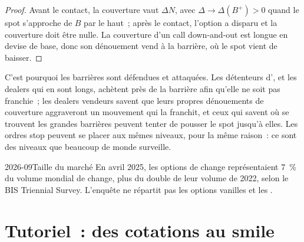 \begin{proof}
Avant le contact, la couverture vaut $\Delta N$, avec $\Delta \to \Delta(B^+) > 0$ quand le spot
s'approche de $B$ par le haut~; après le contact, l'option a disparu et la couverture doit être nulle.
La couverture d'un call down-and-out est longue en devise de base, donc son dénouement vend à
la barrière, où le spot vient de baisser.
\end{proof}

C'est pourquoi les barrières sont défendues et attaquées. Les détenteurs d', et les dealers
qui en sont longs, achètent près de la barrière afin qu'elle ne soit pas franchie~; les dealers vendeurs
savent que leurs propres dénouements de couverture aggraveront un mouvement qui la franchit, et ceux qui
savent où se trouvent les grandes barrières peuvent tenter de pousser le spot jusqu'à elles. Les ordres stop peuvent
se placer aux mêmes niveaux, pour la même raison~: ce sont des niveaux que beaucoup de monde surveille.

\begin{dated}{2026-09}{Taille du marché}\label{dat:m2:the-fx-options-market:size}
En avril 2025, les options de change représentaient 7~\% du volume mondial de change, plus du double de leur
volume de 2022, selon le BIS Triennial Survey. L'enquête ne répartit pas
les options vanilles et les .
\end{dated}

\section{Tutoriel~: des cotations au smile}\label{tut:m2:the-fx-options-market:smile}

